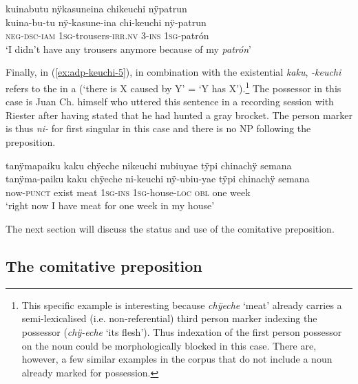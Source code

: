 \ea\label{ex:adp-keuchi-4}
\begingl
\glpreamble kuinabutu nÿkasuneina chikeuchi nÿpatrun\\
\gla kuina-bu-tu nÿ-kasune-ina chi-keuchi nÿ-patrun\\
\glb \textsc{neg}-\textsc{dsc}-\textsc{iam} 1\textsc{sg}-trousers-\textsc{irr.nv} 3-\textsc{ins} 1\textsc{sg}-patrón\\
\glft ‘I didn’t have any trousers anymore because of my \textit{patrón}’
\endgl
\trailingcitation{[mqx-p110826l.454]}
\xe

Finally, in (\ref{ex:adp-keuchi-5}), in combination with the existential  \textit{kaku}, \textit{-keuchi} refers to the  in a  (‘there is X caused by Y’ = ‘Y has X’).\footnote{This specific example is interesting because \textit{chÿeche} ‘meat’ already carries a semi-lexicalised (i.e. non-referential) third person marker indexing the possessor (\textit{chÿ-eche} ‘its flesh’). Thus indexation of the first person possessor on the noun could be morphologically blocked in this case. There are, however, a few similar examples in the corpus that do not include a noun already marked for possession.} The possessor in this case is Juan Ch. himself who uttered this sentence in a recording session with Riester after having stated that he had hunted a gray brocket. The person marker is thus \textit{ni-} for first singular in this case and there is no NP following the preposition.

\ea\label{ex:adp-keuchi-5}
\begingl
\glpreamble tanÿmapaiku kaku chÿeche nikeuchi nubiuyae tÿpi chinachÿ semana\\
\gla tanÿma-paiku kaku chÿeche ni-keuchi nÿ-ubiu-yae tÿpi chinachÿ semana\\
\glb now-\textsc{punct} exist meat 1\textsc{sg}-\textsc{ins} 1\textsc{sg}-house-\textsc{loc} \textsc{obl} one week\\
\glft ‘right now I have meat for one week in my house’
\endgl
\trailingcitation{[nxx-a630101g-1.56]}
\xe
{}

The next section will discuss the status and use of the comitative preposition.



\subsection{The comitative preposition}\label{sec:adp-ajechubu}

